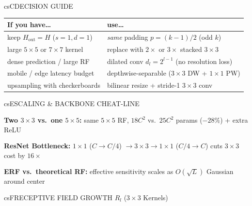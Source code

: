 \documentclass[../../../../master.tex]{subfiles}
\begin{document}
\begin{cscolumns}
\begin{cscard}{csC}{DECISION GUIDE}
  \renewcommand{\arraystretch}{1.22}\small
  \begin{tabular}{@{}>{\raggedright\arraybackslash}p{3.2cm}>{\raggedright\arraybackslash}p{4.6cm}@{}}
    \textbf{If you have\ldots} & \textbf{use\ldots}\\ \hline
    keep $H_{\mathrm{out}}=H$ ($s=1,d=1$) & \emph{same} padding $p=(k-1)/2$ (odd $k$)\\
    large $5\times 5$ or $7\times 7$ kernel & replace with $2\times$ or $3\times$ stacked $3\times 3$\\
    dense prediction / large RF & dilated conv $d_l=2^{l-1}$ (no resolution loss)\\
    mobile / edge latency budget & depthwise-separable ($3\times 3$ DW + $1\times 1$ PW)\\
    upsampling with checkerboards & bilinear resize + stride-1 $3\times 3$ conv\\
  \end{tabular}
\end{cscard}

\begin{cscard}{csE}{SCALING \& BACKBONE CHEAT-LINE}
  \begin{csbul}
    \item \textbf{Two $3\times 3$ vs.\ one $5\times 5$:} same $5\times 5$ RF, $18C^2$ vs.\ $25C^2$ params ($-28\%$) + extra ReLU
    \item \textbf{ResNet Bottleneck:} $1\times 1$ ($C\!\to\! C/4$) $\to 3\times 3 \to 1\times 1$ ($C/4\!\to\! C$) cuts $3\times 3$ cost by $16\times$
    \item \textbf{ERF vs.\ theoretical RF:} effective sensitivity scales as $O(\sqrt{L})$ Gaussian around center
  \end{csbul}
\end{cscard}

\begin{cscard}{csF}{RECEPTIVE FIELD GROWTH $R_l$ ($3\times 3$ Kernels)}
  \centering
\end{cscard}
\columnbreak


\end{cscolumns}
\end{document}
